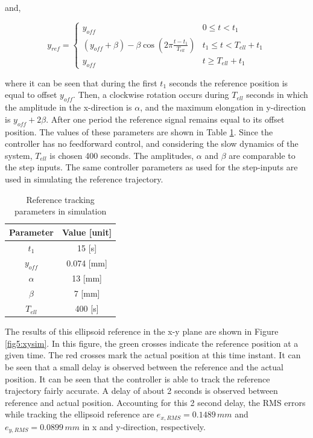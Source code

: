 and,


\begin{equation}
    y_{ref} = \begin{cases} 
       y_{off} &  0 \leq t < t_1 \\
     (y_{off} +\beta) -  \beta \cos(2\pi \frac{t - t_1}{T_{ell}}) & t_1 \leq t < T_{ell} + t_1 \\
     y_{off} & t \geq T_{ell} + t_1
   \end{cases}  
   \end{equation}

where it can be seen that during the first $t_1$ seconds the reference position is equal to offset $y_{off}$. Then, a clockwise rotation occurs during $T_{ell}$ seconds in which the amplitude in the x-direction is $\alpha$, and the maximum elongation in y-direction is $y_{off} + 2\beta$. After one period the reference signal remains equal to its offset position. The values of these parameters are shown in Table \ref{tab5:refparamssim}. Since the controller has no feedforward control, and considering the slow dynamics of the system, $T_{ell}$ is chosen 400 seconds. The amplitudes, $\alpha$ and $\beta$ are comparable to the step inputs. The same controller parameters as used for the step-inputs are used in simulating the reference trajectory.


\begin{table}[H]
    \centering
    \caption{Reference tracking parameters in simulation}
    \begin{tabular}{|c|c|} \hline
   \textbf{Parameter}  & \textbf{Value [unit]} \\ \hline
    $t_1$ &   15 [s]  \\ 
    $y_{off}$ & 0.074 [mm] \\
    $\alpha$ & 13 [mm] \\
    $\beta$ & 7 [mm] \\
    $T_{ell}$ & 400 [s] \\ \hline
\end{tabular}
    \label{tab5:refparamssim}
\end{table}


The results of this ellipsoid reference in the x-y plane are shown in Figure \ref{fig5:xysim}. In this figure, the green crosses indicate the reference position at a given time. The red crosses mark the actual position at this time instant. It can be seen that a small delay is observed between the reference and the actual position. It can be seen that the controller is able to track the reference trajectory fairly accurate. A delay of about 2 seconds is observed between reference and actual position. Accounting for this 2 second delay, the RMS errors while tracking the ellipsoid reference are $e_{x,RMS} = 0.1489 \hspace{2pt} mm$ and $e_{y,RMS} =0.0899  \hspace{2pt} mm$ in x and y-direction, respectively. 

